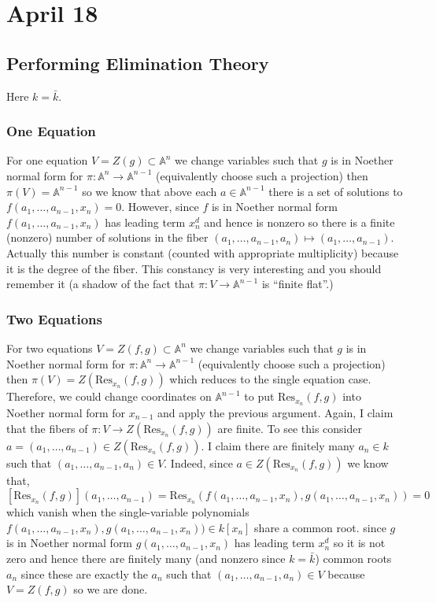 \documentclass[12pt]{article}
\newcommand{\A}{\mathbb{A}}
\renewcommand{\Res}{\mathrm{Res}}
\begin{document}
\section{April 18}

\subsection{Performing Elimination Theory}

\begin{rmk}
Here $k = \bar{k}$.
\end{rmk}


\subsubsection{One Equation}

For one equation $V = Z(g) \subset \A^n$ we change variables such that $g$ is in Noether normal form for $\pi : \A^n \to \A^{n-1}$ (equivalently choose such a projection) then $\pi(V) = \A^{n-1}$ so we know that above each $a \in \A^{n-1}$ there is a set of solutions to $f(a_1, \dots, a_{n-1}, x_n) = 0$. However, since $f$ is in Noether normal form $f(a_1, \dots, a_{n-1}, x_n)$ has leading term $x_n^d$ and hence is nonzero so there is a finite (nonzero) number of solutions in the fiber $(a_1, \dots, a_{n-1}, a_n) \mapsto (a_1, \dots, a_{n-1})$. Actually this number is constant (counted with appropriate multiplicity) because it is the degree of the fiber. This constancy is very interesting and you should remember it (a shadow of the fact that $\pi : V \to \A^{n-1}$ is ``finite flat''.)


\subsubsection{Two Equations}

For two equations $V = Z(f,g) \subset \A^n$ we change variables such that $g$ is in Noether normal form for $\pi : \A^n \to \A^{n-1}$ (equivalently choose such a projection) then $\pi(V) = Z(\Res_{x_n}(f,g))$ which reduces to the single equation case. Therefore, we could change coordinates on $\A^{n-1}$ to put $\Res_{x_n}(f,g)$ into Noether normal form for $x_{n-1}$ and apply the previous argument. Again, I claim that the fibers of $\pi : V \to Z(\Res_{x_n}(f,g))$ are finite. To see this consider $a = (a_1, \dots, a_{n-1}) \in Z(\Res_{x_n}(f,g))$. I claim there are finitely many $a_n \in k$ such that $(a_1, \dots, a_{n-1}, a_n) \in V$. Indeed, since $a \in Z(\Res_{x_n}(f,g))$ we know that,
\[ [\Res_{x_n}(f,g)](a_1, \dots, a_{n-1}) = \Res_{x_n}(f(a_1, \dots, a_{n-1},x_n), g(a_1, \dots, a_{n-1}, x_n)) = 0 \]
which vanish when the single-variable polynomials $f(a_1, \dots, a_{n-1}, x_n), g(a_1, \dots, a_{n-1}, x_n)) \in k[x_n]$ share a common root. since $g$ is in Noether normal form $g(a_1, \dots, a_{n-1}, x_n)$ has leading term $x_n^d$ so it is not zero and hence there are finitely many (and nonzero since $k = \bar{k}$) common roots $a_n$ since these are exactly the $a_n$ such that $(a_1, \dots, a_{n-1}, a_n) \in V$ because $V = Z(f, g)$ so we are done.
\end{document}
